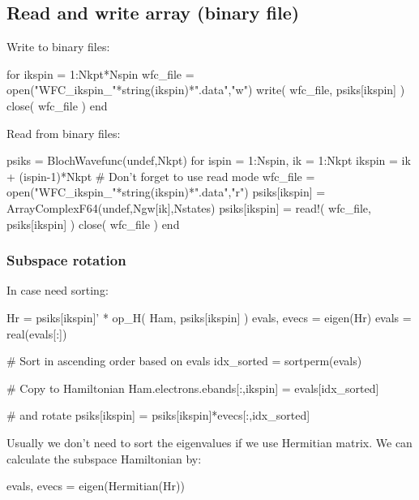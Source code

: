 \subsection{Read and write array (binary file)}

Write to binary files:
\begin{juliacode}
for ikspin = 1:Nkpt*Nspin
  wfc_file = open("WFC_ikspin_"*string(ikspin)*".data","w")
  write( wfc_file, psiks[ikspin] )
  close( wfc_file )
end
\end{juliacode}

Read from binary files:
\begin{juliacode}
psiks = BlochWavefunc(undef,Nkpt)
for ispin = 1:Nspin, ik = 1:Nkpt
  ikspin = ik + (ispin-1)*Nkpt
  # Don't forget to use read mode
  wfc_file = open("WFC_ikspin_"*string(ikspin)*".data","r")
  psiks[ikspin] = Array{ComplexF64}(undef,Ngw[ik],Nstates)
  psiks[ikspin] = read!( wfc_file, psiks[ikspin] )
  close( wfc_file )
end
\end{juliacode}




\subsubsection*{Subspace rotation}

In case need sorting:
\begin{juliacode}
Hr = psiks[ikspin]' * op_H( Ham, psiks[ikspin] )
evals, evecs = eigen(Hr)
evals = real(evals[:])

# Sort in ascending order based on evals
idx_sorted = sortperm(evals)

# Copy to Hamiltonian
Ham.electrons.ebands[:,ikspin] = evals[idx_sorted]

# and rotate
psiks[ikspin] = psiks[ikspin]*evecs[:,idx_sorted]
\end{juliacode}

Usually we don't need to sort the eigenvalues if we use Hermitian matrix. We can calculate the
subspace Hamiltonian by:
\begin{juliacode}
evals, evecs = eigen(Hermitian(Hr))
\end{juliacode}
